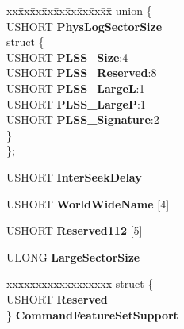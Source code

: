 \begin{DoxyCompactItemize}
\begin{tabbing}
xx\=xx\=xx\=xx\=xx\=xx\=xx\=xx\=xx\=\kill
union \{\\
\>USHORT {\bfseries PhysLogSectorSize}\\
\mbox{\label{union___i_d_e_n_t_i_f_y___d_a_t_a_1_1_0D962_a9112442af01ecd076f4d7b25678a5219}} 
\>struct \{\\
\>\>USHORT {\bfseries PLSS\_Size}:4\\
\>\>USHORT {\bfseries PLSS\_Reserved}:8\\
\>\>USHORT {\bfseries PLSS\_LargeL}:1\\
\>\>USHORT {\bfseries PLSS\_LargeP}:1\\
\>\>USHORT {\bfseries PLSS\_Signature}:2\\
\>\} \\
\}; \\

\end{tabbing}\item 
\mbox{\label{struct___i_d_e_n_t_i_f_y___d_a_t_a_a6ce460b44cba3a7d6d9158bb7bfb924f}} 
U\+S\+H\+O\+RT {\bfseries Inter\+Seek\+Delay}
\item 
\mbox{\label{struct___i_d_e_n_t_i_f_y___d_a_t_a_a9d735904c3177046c3f01779b4c421ee}} 
U\+S\+H\+O\+RT {\bfseries World\+Wide\+Name} \mbox{[}4\mbox{]}
\item 
\mbox{\label{struct___i_d_e_n_t_i_f_y___d_a_t_a_a2f9ee628cd2648e668cf1616a02ed0cc}} 
U\+S\+H\+O\+RT {\bfseries Reserved112} \mbox{[}5\mbox{]}
\item 
\mbox{\label{struct___i_d_e_n_t_i_f_y___d_a_t_a_a676d90e58891899fd876c2f6f2e11460}} 
U\+L\+O\+NG {\bfseries Large\+Sector\+Size}
\item 
\mbox{\label{struct___i_d_e_n_t_i_f_y___d_a_t_a_a1916aee14cd4f8c7ae3395e90317ac07}} 
\begin{tabbing}
xx\=xx\=xx\=xx\=xx\=xx\=xx\=xx\=xx\=\kill
struct \{\\
\>USHORT {\bfseries Reserved}\\
\} {\bfseries CommandFeatureSetSupport}\\


\end{tabbing}
\end{DoxyCompactItemize}
